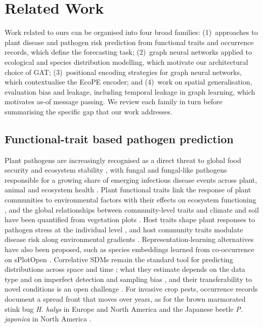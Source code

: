 \documentclass[a4paper,fleqn]{cas-sc}
\begin{document}
\section{Related Work}
\label{sec:relwork}

Work related to ours can be organised into four broad families: (1)~approaches to plant disease and pathogen risk prediction from functional traits and occurrence records, which define the forecasting task; (2)~graph neural networks applied to ecological and species distribution modelling, which motivate our architectural choice of GAT; (3)~positional encoding strategies for graph neural networks, which contextualise the EcoPE encoder; and (4)~work on spatial generalisation, evaluation bias and leakage, including temporal leakage in graph learning, which motivates as-of message passing. We review each family in turn before summarising the specific gap that our work addresses.

\subsection{Functional-trait based pathogen prediction}

Plant pathogens are increasingly recognised as a direct threat to global food security and ecosystem stability \citep{bebber2014}, with fungal and fungal-like pathogens responsible for a growing share of emerging infectious disease events across plant, animal and ecosystem health \citep{fisher2012}. Plant functional traits link the response of plant communities to environmental factors with their effects on ecosystem functioning \citep{lavorel2002}, and the global relationships between community-level traits and climate and soil have been quantified from vegetation plots \citep{bruelheide2018}. Host traits shape plant responses to pathogen stress at the individual level \citep{jin2021}, and host community traits modulate disease risk along environmental gradients \citep{halliday2021}. Representation-learning alternatives have also been proposed, such as species embeddings learned from co-occurrence on sPlotOpen \citep{siefert2024}. Correlative SDMs remain the standard tool for predicting distributions across space and time \citep{elith2009}; what they estimate depends on the data type and on imperfect detection and sampling bias \citep{guillera2015}, and their transferability to novel conditions is an open challenge \citep{yates2018}. For invasive crop pests, occurrence records document a spread front that moves over years, as for the brown marmorated stink bug \textit{H. halys} in Europe and North America \citep{leskey2018} and the Japanese beetle \textit{P. japonica} in North America \citep{althoff2022}.
\end{document}
